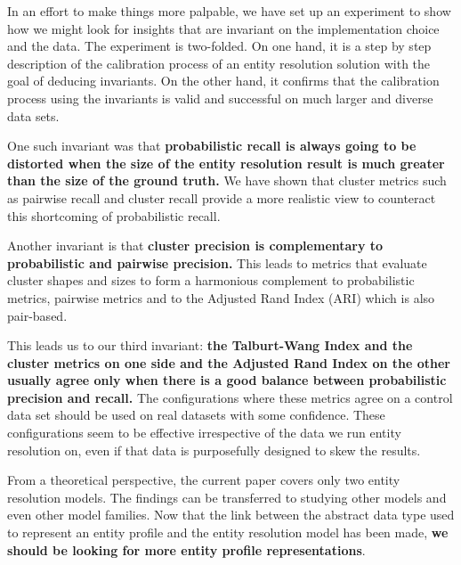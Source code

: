 \documentclass[journal]{IEEEtran}
\begin{document}
    In an effort to make things more palpable, we have set up an experiment to
    show how we might look for insights that are invariant on the implementation
    choice and the data.
    The experiment is two-folded.
    On one hand, it is a step by step description of the calibration process of
    an entity resolution solution with the goal of deducing invariants.
    On the other hand, it confirms that the calibration process using the
    invariants is valid and successful on much larger and diverse data sets.
    
    One such invariant was that \textbf{probabilistic recall is always going to
    be distorted when the size of the entity resolution result is much greater
    than the size of the ground truth.}
    We have shown that cluster metrics such as pairwise recall and cluster
    recall provide a more realistic view to counteract this shortcoming of
    probabilistic recall.

    Another invariant is that \textbf{cluster precision is complementary to
    probabilistic and pairwise precision.}
    This leads to metrics that evaluate cluster shapes and sizes to form a
    harmonious complement to probabilistic metrics, pairwise metrics and to the
    Adjusted Rand Index (ARI) which is also pair-based.
    
    This leads us to our third invariant: \textbf{the Talburt-Wang Index and the
    cluster metrics on one side and the Adjusted Rand Index on the other usually
    agree only when there is a good balance between probabilistic precision and
    recall.}
    The configurations where these metrics agree on a control data set should be
    used on real datasets with some confidence.
    These configurations seem to be effective irrespective of the data we run
    entity resolution on, even if that data is purposefully designed to skew the
    results.


    From a theoretical perspective, the current paper covers only two entity
    resolution models.
    The findings can be transferred to studying other models and even other
    model families.
    Now that the link between the abstract data type used to represent an entity
    profile and the entity resolution model has been made, \textbf{we should be
    looking for more entity profile representations}.
\end{document}
